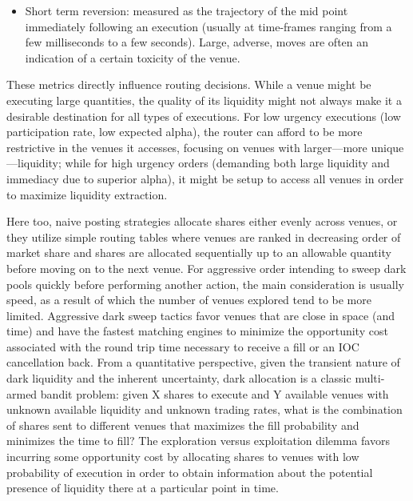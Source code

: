 \begin{itemize}
\begin{itemize}
\item Short term reversion: measured as the trajectory of the mid point immediately following an execution (usually at time-frames ranging from a few milliseconds to a few seconds). Large, adverse, moves are often an indication of a certain toxicity of the venue. 
\end{itemize}


These metrics directly influence routing decisions. While a venue might be executing large quantities, the quality of its liquidity might not always make it a desirable destination for all types of executions. For low urgency executions (low participation rate, low expected alpha), the router can afford to be more restrictive in the venues it accesses, focusing on venues with larger---more unique---liquidity; while for high urgency orders (demanding both large liquidity and immediacy due to superior alpha), it might be setup to access all venues in order to maximize liquidity extraction.


Here too, naive posting strategies allocate shares either evenly across venues, or they utilize simple routing tables where venues are ranked in decreasing order of market share and shares are allocated sequentially up to an allowable quantity before moving on to the next venue. For aggressive order intending to sweep dark pools quickly before performing another action, the main consideration is usually speed, as a result of which the number of venues explored tend to be more limited. Aggressive dark sweep tactics favor venues that are close in space (and time) and have the fastest matching engines to minimize the opportunity cost associated with the round trip time necessary to receive a fill or an IOC cancellation back. From a quantitative perspective, given the transient nature of dark liquidity and the inherent uncertainty, dark allocation is a classic multi-armed bandit problem: given X shares to execute and Y available venues with unknown available liquidity and unknown trading rates, what is the combination of shares sent to different venues that maximizes the fill probability and minimizes the time to fill? The exploration versus exploitation dilemma favors incurring some opportunity cost by allocating shares to venues with low probability of execution in order to obtain information about the potential presence of liquidity there at a particular point in time.



\end{itemize}

